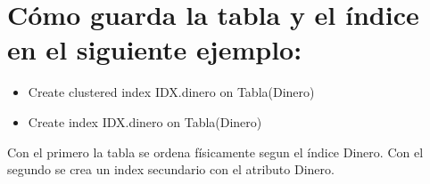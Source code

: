\documentclass[a4paper,12pt]{article}
\begin{document}
\section{Cómo guarda la tabla y el índice en el siguiente ejemplo:}


  \begin{itemize}
   \item Create clustered index IDX.dinero on Tabla(Dinero)
   \item Create index IDX.dinero on Tabla(Dinero)
  \end{itemize}

  Con el primero la tabla se ordena físicamente segun el índice
  Dinero.
  Con el segundo se crea un index secundario con el atributo Dinero.
  
  
  
    

    
    
\end{document}
